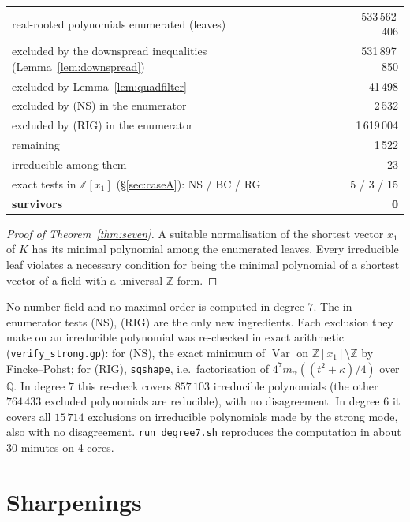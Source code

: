 \documentclass[11pt]{amsart}
\theoremstyle{definition}
\DeclareMathOperator{\Var}{Var}
\newcommand{\Q}{\mathbb{Q}}
\newcommand{\Z}{\mathbb{Z}}
\newcommand{\file}[1]{\texttt{#1}}
\begin{document}
\begin{center}
\begin{tabular}{lr}
\toprule
real-rooted polynomials enumerated (leaves) & 533\,562\,406\\
excluded by the downspread inequalities (Lemma~\ref{lem:downspread}) & 531\,897\,850\\
excluded by Lemma~\ref{lem:quadfilter} & 41\,498\\
excluded by (NS) in the enumerator & 2\,532\\
excluded by (RIG) in the enumerator & 1\,619\,004\\
remaining & 1\,522\\
\midrule
irreducible among them & 23\\
exact tests in $\Z[x_1]$ (\S\ref{sec:caseA}): NS / BC / RG & 5 / 3 / 15\\
\textbf{survivors} & \textbf{0}\\
\bottomrule
\end{tabular}
\end{center}

\begin{proof}[Proof of Theorem~\ref{thm:seven}]
A suitable normalisation of the shortest vector $x_1$ of $K$ has its minimal polynomial among
the enumerated leaves.  Every irreducible leaf violates a necessary condition for being the
minimal polynomial of a shortest vector of a field with a universal $\Z$-form.
\end{proof}

No number field and no maximal order is computed in degree $7$.  The in-enumerator tests (NS),
(RIG) are the only new ingredients.  Each exclusion they make on an irreducible polynomial was
re-checked in exact arithmetic (\file{verify\_strong.gp}): for (NS), the exact minimum of $\Var$
on $\Z[x_1]\setminus\Z$ by Fincke--Pohst; for (RIG), \texttt{sqshape}, i.e.\ factorisation of
$4^7m_\alpha((t^2+\kappa)/4)$ over $\Q$.  In degree $7$ this re-check covers
$857\,103$ irreducible polynomials (the other $764\,433$ excluded polynomials are reducible), with no disagreement.  In degree $6$ it covers all
$15\,714$ exclusions on irreducible polynomials made by the strong mode, also with no
disagreement.  \file{run\_degree7.sh} reproduces the computation in about 30 minutes on
4 cores.

\section{Sharpenings}\label{sec:sharp}
\end{document}
